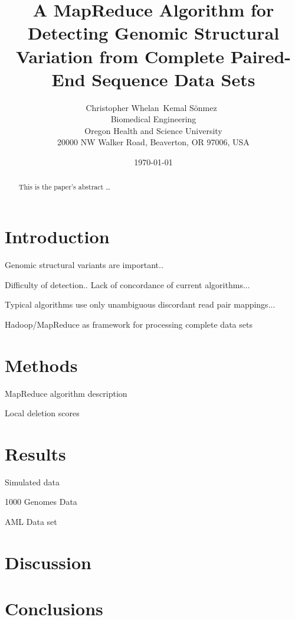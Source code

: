 \documentclass[12pt]{article}
\begin{document}
\title{A MapReduce Algorithm for Detecting Genomic Structural Variation from Complete Paired-End Sequence Data Sets}

\author{
Christopher Whelan\ Kemal S\"onmez\ \\
Biomedical Engineering \\
Oregon Health and Science University \\
20000 NW Walker Road, Beaverton, OR 97006, USA
}

\date{\today}

\maketitle

\begin{abstract}
This is the paper's abstract \ldots
\end{abstract}

\section{Introduction}
Genomic structural variants are important..

Difficulty of detection.. Lack of concordance of current algorithms...

Typical algorithms use only unambiguous discordant read pair mappings...

Hadoop/MapReduce as framework for processing complete data sets

\section{Methods}\label{Methods}

MapReduce algorithm description

Local deletion scores

\section{Results}\label{results}

Simulated data

1000 Genomes Data

AML Data set

\section{Discussion}\label{discussion}



\section{Conclusions}\label{conclusions}





\end{document}
